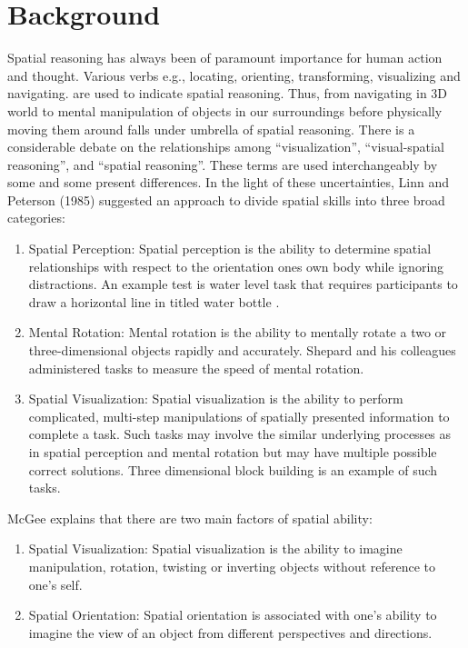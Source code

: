 \chapter{Background}
\label{chap:two}

Spatial reasoning has always been of paramount importance for human action and thought. Various verbs e.g., locating, orienting, transforming, visualizing and navigating. are used to indicate spatial reasoning. Thus, from navigating in 3D world to mental manipulation of objects in our surroundings before physically moving them around falls under umbrella of spatial reasoning. There is a considerable debate on the relationships among “visualization”, “visual-spatial reasoning”, and “spatial reasoning”. These terms are used interchangeably by some and some present differences. In the light of these uncertainties, Linn and Peterson (1985) \parencite{linn1986} suggested an approach to divide spatial skills into three broad categories:
\begin{enumerate}
    \item Spatial Perception: Spatial perception is the ability to determine spatial relationships with respect to the orientation one\textquotesingle s own body while ignoring distractions. An example test is water level task that requires participants to draw a horizontal line in titled water bottle \parencite{piaget2013growth}.
    \item Mental Rotation: Mental rotation is the ability to mentally rotate a two or three-dimensional objects rapidly and accurately. Shepard and his colleagues \parencite{cooperau1973time} \parencite{shepard1971mental} administered tasks to measure the speed of mental rotation.
    \item Spatial Visualization: Spatial visualization is the ability to perform complicated, multi-step manipulations of spatially presented information to complete a task. Such tasks may involve the similar underlying processes as in spatial perception and mental rotation but may have multiple possible correct solutions. Three dimensional block building is an example of such tasks.
\end{enumerate}
McGee \parencite{mcgee1979human} explains that there are two main factors of spatial ability:
\begin{enumerate}
    \item Spatial Visualization: Spatial visualization is the ability to imagine manipulation, rotation, twisting or inverting objects without reference to one's self. 
    \item Spatial Orientation: Spatial orientation is associated with one's ability to imagine the view of an object from different perspectives and directions. 
\end{enumerate}
